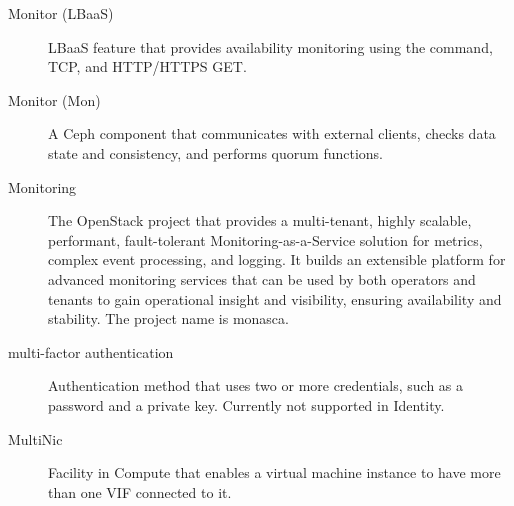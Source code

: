 \documentclass[letterpaper,10pt,english]{sphinxmanual}
\begin{document}
\begin{description}
\item[{Monitor (LBaaS)}] \leavevmode{}\label{_source/glossary:term-monitor-lbaas}
LBaaS feature that provides availability monitoring using the
 command, TCP, and HTTP/HTTPS GET.

\item[{Monitor (Mon)}] \leavevmode{}\label{_source/glossary:term-monitor-mon}
A Ceph component that communicates with external clients, checks
data state and consistency, and performs quorum functions.

\item[{Monitoring}] \leavevmode{}\label{_source/glossary:term-monitoring}
The OpenStack project that provides a multi-tenant, highly
scalable, performant, fault-tolerant Monitoring-as-a-Service
solution for metrics, complex event processing, and logging.
It builds an extensible platform for advanced monitoring
services that can be used by both operators and tenants to
gain operational insight and visibility, ensuring
availability and stability. The project name is monasca.

\item[{multi-factor authentication}] \leavevmode{}\label{_source/glossary:term-multi-factor-authentication}
Authentication method that uses two or more credentials, such as
a password and a private key. Currently not supported in
Identity.

\item[{MultiNic}] \leavevmode{}\label{_source/glossary:term-418}
Facility in Compute that enables a virtual machine instance to
have more than one VIF connected to it.

\end{description}
\end{document}

